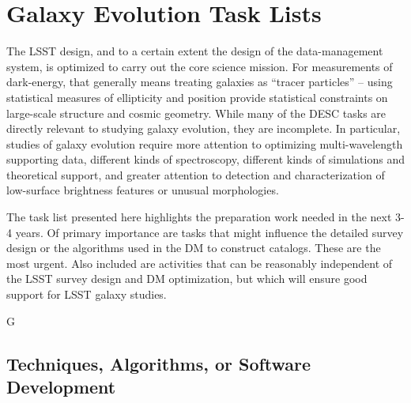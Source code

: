 
\section{Galaxy Evolution Task Lists}\label{sec:tasks:gal:intro}  

The LSST design, and to a certain extent the design of the data-management
system, is optimized to carry out the core science mission. For measurements
of dark-energy, that generally means treating galaxies as ``tracer particles'' --
using statistical measures of ellipticity and position provide statistical
constraints on large-scale structure and cosmic geometry. While many of the
DESC tasks are directly relevant to studying galaxy evolution, they are 
incomplete. In particular, studies of galaxy evolution require more attention to 
optimizing multi-wavelength supporting data, different kinds of spectroscopy, different
kinds of simulations and theoretical support, and greater attention to detection
and characterization of low-surface brightness features or unusual morphologies.

The task list presented here highlights the preparation work needed in the next 3-4
years. Of primary importance are tasks that might influence the detailed survey
design or the algorithms used in the DM to construct catalogs. These are the most
urgent. Also included are activities that can be reasonably independent of the
LSST survey design and DM optimization, but which will ensure good support for
LSST galaxy studies.

\begin{tasklist}{G}
\begin{task}
\label{task:label_for_this_task}
\end{task}
\end{tasklist}  

\subsection{Techniques, Algorithms, or Software Development} \label{sec:tasks:gal:techniques_and_algorithms}

